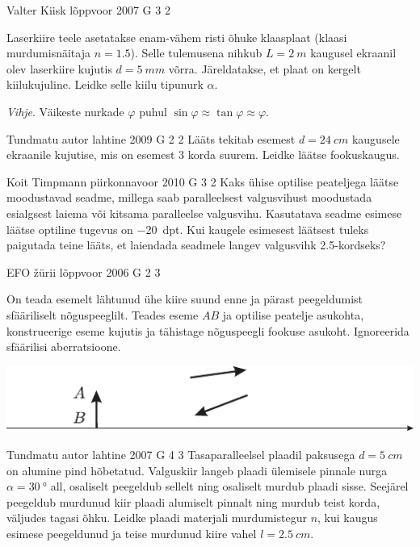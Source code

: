 \documentclass[11pt]{article}
\begin{document}
{%
{Valter Kiisk} %
{lõppvoor} %
{2007} %
{G 3} %
{2} %
{
\ifStatement
Laserkiire teele asetatakse enam-vähem risti õhuke klaasplaat (klaasi murdumisnäitaja $n = \num{1,5}$). Selle tulemusena nihkub $L = \SI{2}{m}$ kaugusel ekraanil olev laserkiire kujutis $d = \SI{5}{mm}$ võrra. Järeldatakse, et plaat on kergelt kiilukujuline. Leidke selle kiilu tipunurk $\alpha$. 

\emph{Vihje}. Väikeste nurkade $\varphi$ puhul $\sin \varphi \approx \tan \varphi \approx \varphi$.
\fi
}

{Tundmatu autor} %
{lahtine} %
{2009} %
{G 2} %
{2} %
{
\ifStatement
Lääts tekitab esemest $d = \SI{24}{cm}$ kaugusele ekraanile kujutise, mis on esemest \num{3} korda suurem. Leidke läätse fookuskaugus.
\fi
}

{Koit Timpmann} %
{piirkonnavoor} %
{2010} %
{G 3} %
{2} %
{
\ifStatement
Kaks ühise optilise peateljega läätse moodustavad seadme, millega saab paralleelsest valgusvihust moodustada esialgsest laiema või kitsama paralleelse valgusvihu. Kasutatava seadme esimese läätse optiline tugevus on \SI{-20}{dpt}. Kui kaugele esimesest läätsest tuleks paigutada teine lääts, et laiendada seadmele langev valgusvihk \num{2.5}-kordseks?
\fi
}

{EFO žürii} %
{lõppvoor} %
{2006} %
{G 2} %
{3} %
{
\ifStatement
On teada esemelt lähtunud ühe kiire suund enne ja pärast peegeldumist sfääriliselt nõguspeeglilt. Teades eseme $AB$ ja optilise peatelje asukohta, konstrueerige eseme kujutis ja tähistage nõguspeegli fookuse asukoht. Ignoreerida sfäärilisi aberratsioone.

\begin{center}
	\includegraphics[width=0.9\linewidth]{2006-v3g-02-yl}
\end{center}
\fi
}

{Tundmatu autor} %
{lahtine} %
{2007} %
{G 4} %
{3} %
{
\ifStatement
Tasaparalleelsel plaadil paksusega $d = \SI{5}{cm}$ on alumine pind hõbetatud. Valguskiir langeb plaadi ülemisele pinnale nurga $\alpha = \SI{30}{\degree}$ all, osaliselt peegeldub sellelt ning osaliselt murdub plaadi sisse. Seejärel peegeldub murdunud kiir plaadi alumiselt pinnalt ning murdub teist korda, väljudes tagasi õhku. Leidke plaadi materjali murdumistegur $n$, kui kaugus esimese peegeldunud ja teise murdunud kiire vahel $l = \SI{2,5}{cm}$.
\fi
}

}
\end{document}
